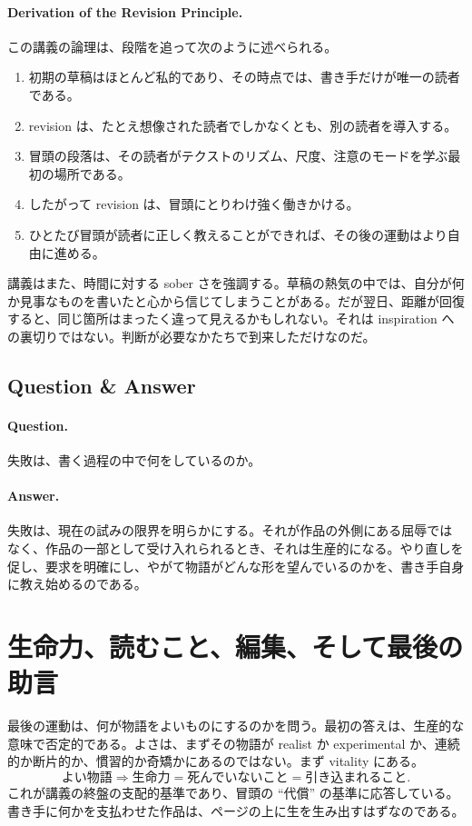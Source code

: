 \paragraph{Derivation of the Revision Principle.} この講義の論理は、段階を追って次のように述べられる。
\begin{enumerate}
\item 初期の草稿はほとんど私的であり、その時点では、書き手だけが唯一の読者である。
\item revision は、たとえ想像された読者でしかなくとも、別の読者を導入する。
\item 冒頭の段落は、その読者がテクストのリズム、尺度、注意のモードを学ぶ最初の場所である。
\item したがって revision は、冒頭にとりわけ強く働きかける。
\item ひとたび冒頭が読者に正しく教えることができれば、その後の運動はより自由に進める。
\end{enumerate}

講義はまた、時間に対する sober さを強調する。草稿の熱気の中では、自分が何か見事なものを書いたと心から信じてしまうことがある。だが翌日、距離が回復すると、同じ箇所はまったく違って見えるかもしれない。それは inspiration への裏切りではない。判断が必要なかたちで到来しただけなのだ。

\subsection{Question \& Answer}

\paragraph{Question.} 失敗は、書く過程の中で何をしているのか。

\paragraph{Answer.} 失敗は、現在の試みの限界を明らかにする。それが作品の外側にある屈辱ではなく、作品の一部として受け入れられるとき、それは生産的になる。やり直しを促し、要求を明確にし、やがて物語がどんな形を望んでいるのかを、書き手自身に教え始めるのである。

\section{生命力、読むこと、編集、そして最後の助言}

最後の運動は、何が物語をよいものにするのかを問う。最初の答えは、生産的な意味で否定的である。よさは、まずその物語が realist か experimental か、連続的か断片的か、慣習的か奇矯かにあるのではない。まず vitality にある。
\begin{equation}
\text{よい物語} \Rightarrow \text{生命力} = \text{死んでいないこと} = \text{引き込まれること}.
\end{equation}
これが講義の終盤の支配的基準であり、冒頭の ``代償'' の基準に応答している。書き手に何かを支払わせた作品は、ページの上に生を生み出すはずなのである。

